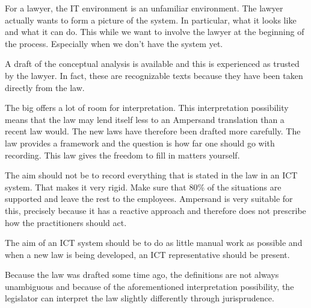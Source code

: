 
{For a lawyer, the IT environment is an unfamiliar environment. 
The lawyer actually wants to form a picture of the system. 
In particular, what it looks like and what it can do. 
This while we want to involve the lawyer at the beginning of the process.
Especially when we don't have the system yet.}

{A draft of the conceptual analysis is available and this is experienced as trusted by the lawyer. 
In fact, these are recognizable texts because they have been taken directly from the law.}

{The \acrshort{big} offers a lot of room for interpretation. 
This interpretation possibility means that the law may lend itself less to an Ampersand translation than a recent law would.
The new laws have therefore been drafted more carefully. 
The law provides a framework and the question is how far one should go with recording. 
This law gives the freedom to fill in matters yourself.}

{The aim should not be to record everything that is stated in the law in an ICT system. 
That makes it very rigid.
Make sure that 80\% of the situations are supported and leave the rest to the employees.
Ampersand is very suitable for this, precisely because it has a reactive approach and therefore does not prescribe how the practitioners should act.}

{The aim of an ICT system should be to do as little manual work as possible and when a new law is being developed, an ICT representative should be present.}

{Because the law was drafted some time ago, the definitions are not always unambiguous and because of the aforementioned interpretation possibility, the legislator can interpret the law slightly differently through jurisprudence.}

